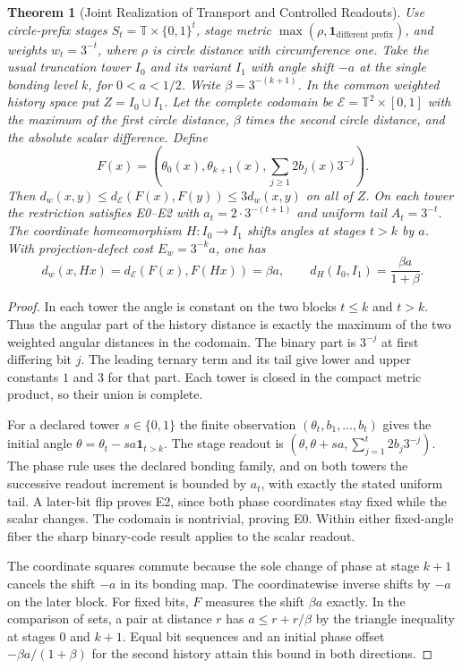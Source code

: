 \documentclass[11pt,a4paper]{article}
\theoremstyle{plain}
\newtheorem{theorem}{Theorem}[section]
\theoremstyle{definition}
\theoremstyle{remark}
\begin{document}
\begin{theorem}[Joint Realization of Transport and Controlled Readouts]\label{thm:joint-transport-readout}
Use circle-prefix stages $S_t=\mathbb T\times\{0,1\}^t$, stage metric $\max(\rho,\mathbf{1}_{\text{different prefix}})$, and weights $w_t=3^{-t}$, where $\rho$ is circle distance with circumference one. Take the usual truncation tower $I_0$ and its variant $I_1$ with angle shift $-a$ at the single bonding level $k$, for $0<a<1/2$. Write $\beta=3^{-(k+1)}$. In the common weighted history space put $Z=I_0\cup I_1$. Let the complete codomain be $\mathcal E=\mathbb T^2\times[0,1]$ with the maximum of the first circle distance, $\beta$ times the second circle distance, and the absolute scalar difference. Define
\[
 F(x)=\left(\theta_0(x),\theta_{k+1}(x),\sum_{j\geq1}2b_j(x)3^{-j}\right).
\]
Then $d_w(x,y)\leq d_{\mathcal E}(F(x),F(y))\leq3d_w(x,y)$ on all of $Z$. On each tower the restriction satisfies E0--E2 with $a_t=2\cdot3^{-(t+1)}$ and uniform tail $A_t=3^{-t}$. The coordinate homeomorphism $H:I_0\to I_1$ shifts angles at stages $t>k$ by $a$. With projection-defect cost $E_w=3^{-k}a$, one has
\[
 d_w(x,Hx)=d_{\mathcal E}(F(x),F(Hx))=\beta a,\qquad
 d_H(I_0,I_1)=\frac{\beta a}{1+\beta}.
\]
\end{theorem}
\begin{proof}
In each tower the angle is constant on the two blocks $t\le k$ and $t>k$. Thus the angular part of the history distance is exactly the maximum of the two weighted angular distances in the codomain. The binary part is $3^{-j}$ at first differing bit $j$. The leading ternary term and its tail give lower and upper constants $1$ and $3$ for that part. Each tower is closed in the compact metric product, so their union is complete.

For a declared tower $s\in\{0,1\}$ the finite observation $(\theta_t,b_1,\ldots,b_t)$ gives the initial angle $\theta=\theta_t-sa\mathbf 1_{t>k}$. The stage readout is $(\theta,\theta+sa,\sum_{j=1}^t2b_j3^{-j})$. The phase rule uses the declared bonding family, and on both towers the successive readout increment is bounded by $a_t$, with exactly the stated uniform tail. A later-bit flip proves E2, since both phase coordinates stay fixed while the scalar changes. The codomain is nontrivial, proving E0. Within either fixed-angle fiber the sharp binary-code result applies to the scalar readout.

The coordinate squares commute because the sole change of phase at stage $k+1$ cancels the shift $-a$ in its bonding map. The coordinatewise inverse shifts by $-a$ on the later block. For fixed bits, $F$ measures the shift $\beta a$ exactly. In the comparison of sets, a pair at distance $r$ has $a\leq r+r/\beta$ by the triangle inequality at stages $0$ and $k+1$. Equal bit sequences and an initial phase offset $-\beta a/(1+\beta)$ for the second history attain this bound in both directions.
\end{proof}
\end{document}
